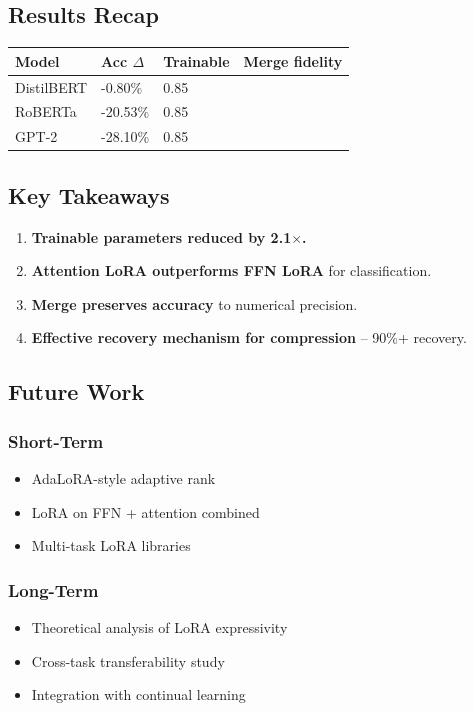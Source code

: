 \subsection{Results Recap}

\begin{table}[H]
\centering
\small
\begin{tabular}{llll}
\toprule
\textbf{Model} & \textbf{Acc $\Delta$} & \textbf{Trainable} & \textbf{Merge fidelity} \\
\midrule
DistilBERT & -0.80\% & 0.85 &  \\
RoBERTa & -20.53\% & 0.85 &  \\
GPT-2 & -28.10\% & 0.85 &  \\
\bottomrule
\end{tabular}
\end{table}

\subsection{Key Takeaways}

\begin{enumerate}
\item \textbf{Trainable parameters reduced by 2.1$\times$.}
\item \textbf{Attention LoRA outperforms FFN LoRA} for classification.
\item \textbf{Merge preserves accuracy} to numerical precision.
\item \textbf{Effective recovery mechanism for compression} -- 90\%+ recovery.

\end{enumerate}
\subsection{Future Work}

\subsubsection{Short-Term}
\begin{itemize}
\item AdaLoRA-style adaptive rank
\item LoRA on FFN + attention combined
\item Multi-task LoRA libraries

\end{itemize}
\subsubsection{Long-Term}
\begin{itemize}
\item Theoretical analysis of LoRA expressivity
\item Cross-task transferability study
\item Integration with continual learning

\end{itemize}
